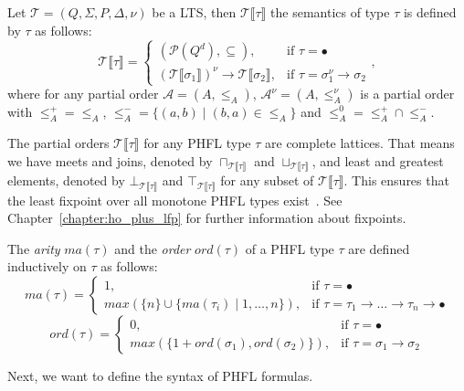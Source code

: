 \begin{definition}
    Let $\mathcal{T} = (Q, \Sigma, P, \Delta, \nu)$ be a LTS, then $\mathcal{T}\llbracket\tau\rrbracket$ the semantics
    of type $\tau$ is defined by $\tau$ as follows:
        \[\mathcal{T}\llbracket\tau\rrbracket=
        \begin{cases}
            (\mathcal{P}(Q^d), \subseteq),  & \text{if }\tau = \bullet\\
            (\mathcal{T}\llbracket\sigma_1\rrbracket)^\nu \rightarrow \mathcal{T}\llbracket\sigma_2\rrbracket, &
            \text{if }\tau = \sigma_1^\nu\rightarrow \sigma_2
        \end{cases},\]
    where for any partial order $\mathcal{A} = (A, \leq_A)$, $\mathcal{A}^\nu = (A, \leq_A^\nu)$ is a partial order
    with $\leq_A^+ = \leq_A$, $\leq_A^- = \{(a, b) \mid (b, a) \in \leq_A\}$ and $\leq_A^0 = \leq_A^+ \cap \leq_A^-$.
\end{definition}

The partial orders $\mathcal{T}\llbracket\tau\rrbracket$ for any PHFL type $\tau$ are complete lattices. That means we
have meets and joins, denoted by $\sqcap_{\mathcal{T}\llbracket\tau\rrbracket}$ and
$\sqcup_{\mathcal{T}\llbracket\tau\rrbracket}$, and least and greatest elements, denoted by
$\bot_{\mathcal{T}\llbracket\tau\rrbracket}$ and $\top_{\mathcal{T}\llbracket\tau\rrbracket}$ for any subset of
$\mathcal{T}\llbracket\tau\rrbracket$. This ensures that the least fixpoint over all monotone PHFL types
exist~\cite{tarski1955lattice}. See Chapter~\ref{chapter:ho_plus_lfp} for further information about fixpoints.

\begin{definition}
    The \emph{arity} $ma(\tau)$ and the \emph{order} $ord(\tau)$ of a PHFL type $\tau$ are defined inductively on
    $\tau$ as follows:
\[ma(\tau)=
\begin{cases}
    1, & \text{if }\tau = \bullet\\
    max(\{n\} \cup \{ma(\tau_i)\mid1,\dots,n\}), &
    \text{if }\tau = \tau_1\rightarrow\dots\rightarrow\tau_n\rightarrow\bullet
\end{cases}\]
\[ord(\tau)=
\begin{cases}
    0, & \text{if }\tau = \bullet\\
    max(\{1 + ord(\sigma_1), ord(\sigma_2)\}), & \text{if }\tau = \sigma_1 \rightarrow \sigma_2
\end{cases}\]
\end{definition}

Next, we want to define the syntax of PHFL formulas.

